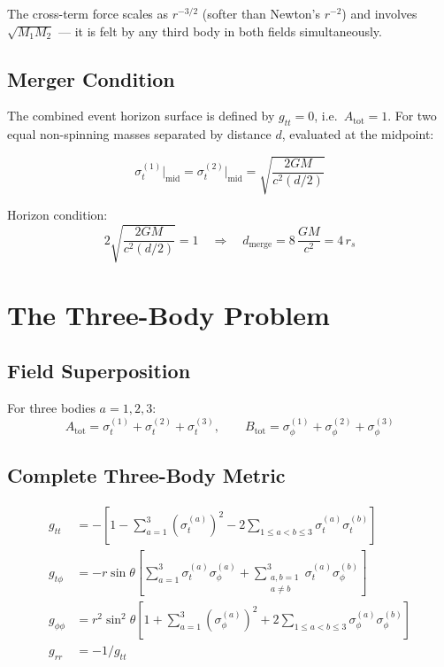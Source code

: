 \documentclass[11pt,a4paper]{article}
\theoremstyle{definition}
\theoremstyle{remark}
\newcommand{\sig}[2]{\sigma_{#1}^{(#2)}}
\begin{document}
	The cross-term force scales as $r^{-3/2}$ (softer than Newton's $r^{-2}$)
	and involves $\sqrt{M_1 M_2}$ — it is felt by any third body in both
	fields simultaneously.
	
	\subsection{Merger Condition}
	
	The combined event horizon surface is defined by $g_{tt}=0$, i.e.\
	$A_{\mathrm{tot}}=1$.
	For two equal non-spinning masses separated by distance $d$, evaluated
	at the midpoint:
	
	\begin{equation}
		\sig{t}{1}\big|_{\mathrm{mid}}
		= \sig{t}{2}\big|_{\mathrm{mid}}
		= \sqrt{\frac{2GM}{c^2(d/2)}}
	\end{equation}
	
	Horizon condition:
	\begin{equation}\label{eq:merger}
		\boxed{
			2\sqrt{\frac{2GM}{c^2(d/2)}} = 1
			\quad\Longrightarrow\quad
			d_{\mathrm{merge}} = 8\,\frac{GM}{c^2} = 4\,r_s
		}
	\end{equation}
	
	\section{The Three-Body Problem}
	\label{sec:three_body}
	
	\subsection{Field Superposition}
	
	For three bodies $a=1,2,3$:
	\begin{equation}
		A_{\mathrm{tot}} = \sig{t}{1}+\sig{t}{2}+\sig{t}{3},\qquad
		B_{\mathrm{tot}} = \sig{\phi}{1}+\sig{\phi}{2}+\sig{\phi}{3}
	\end{equation}
	
	\subsection{Complete Three-Body Metric}
		\begin{align}
			g_{tt} &= -\left[1
			- \sum_{a=1}^{3}\left(\sig{t}{a}\right)^2
			- 2\!\!\sum_{1\le a<b\le 3}\!\!\sig{t}{a}\sig{t}{b}
			\right]
			\label{eq:gtt_3body}\\[6pt]
			g_{t\phi} &= -r\sin\theta\left[
			\sum_{a=1}^{3}\sig{t}{a}\sig{\phi}{a}
			+\sum_{\substack{a,b=1\\a\ne b}}^{3}\sig{t}{a}\sig{\phi}{b}
			\right]
			\label{eq:gtphi_3body}\\[6pt]
			g_{\phi\phi} &= r^2\sin^2\!\theta\left[
			1+\sum_{a=1}^{3}\left(\sig{\phi}{a}\right)^2
			+2\!\!\sum_{1\le a<b\le 3}\!\!\sig{\phi}{a}\sig{\phi}{b}
			\right]
			\label{eq:gphiphi_3body}\\[6pt]
			g_{rr} &= -1/g_{tt}
			\label{eq:grr_3body}
		\end{align}
	
\end{document}
